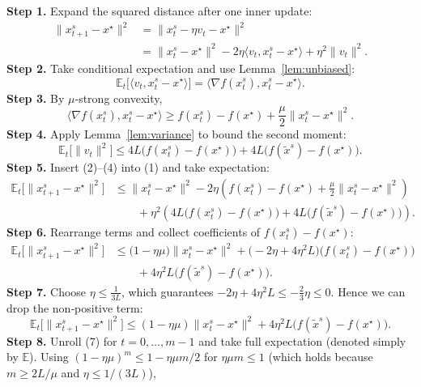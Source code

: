 \documentclass{article}
\begin{document}
\noindent\textbf{Step 1.} Expand the squared distance after one inner update:
\[
\begin{aligned}
\|x^{s}_{t+1}-x^{\star}\|^{2}
&=\|x^{s}_{t}-\eta v_t-x^{\star}\|^{2}\\
&=\|x^{s}_{t}-x^{\star}\|^{2}
   -2\eta\langle v_t,x^{s}_{t}-x^{\star}\rangle
   +\eta^{2}\|v_t\|^{2}.
\end{aligned}
\tag{1}
\]
\noindent\textbf{Step 2.} Take conditional expectation and use Lemma~\ref{lem:unbiased}:
\[
\mathbb{E}_t\!\bigl[\langle v_t,x^{s}_{t}-x^{\star}\rangle\bigr]
= \langle\nabla f(x^{s}_{t}),x^{s}_{t}-x^{\star}\rangle .
\tag{2}
\]
\noindent\textbf{Step 3.} By $\mu$‑strong convexity,
\[
\langle\nabla f(x^{s}_{t}),x^{s}_{t}-x^{\star}\rangle
\ge f(x^{s}_{t})-f(x^{\star})+\frac{\mu}{2}\|x^{s}_{t}-x^{\star}\|^{2}.
\tag{3}
\]
\noindent\textbf{Step 4.} Apply Lemma~\ref{lem:variance} to bound the second moment:
\[
\mathbb{E}_t\!\bigl[\|v_t\|^{2}\bigr]
\le 4L\bigl(f(x^{s}_{t})-f(x^{\star})\bigr)
   +4L\bigl(f(\tilde{x}^{s})-f(x^{\star})\bigr).
\tag{4}
\]
\noindent\textbf{Step 5.} Insert (2)–(4) into (1) and take expectation:
\[
\begin{aligned}
\mathbb{E}_t\!\bigl[\|x^{s}_{t+1}-x^{\star}\|^{2}\bigr]
&\le \|x^{s}_{t}-x^{\star}\|^{2}
   -2\eta\!\left(f(x^{s}_{t})-f(x^{\star})+\frac{\mu}{2}\|x^{s}_{t}-x^{\star}\|^{2}\right)\\
&\qquad +\eta^{2}\!\left(4L\bigl(f(x^{s}_{t})-f(x^{\star})\bigr)
   +4L\bigl(f(\tilde{x}^{s})-f(x^{\star})\bigr)\right).
\end{aligned}
\tag{5}
\]
\noindent\textbf{Step 6.} Rearrange terms and collect coefficients of $f(x^{s}_{t})-f(x^{\star})$:
\[
\begin{aligned}
\mathbb{E}_t\!\bigl[\|x^{s}_{t+1}-x^{\star}\|^{2}\bigr]
&\le \bigl(1-\eta\mu\bigr)\|x^{s}_{t}-x^{\star}\|^{2}
   +\bigl(-2\eta+4\eta^{2}L\bigr)\bigl(f(x^{s}_{t})-f(x^{\star})\bigr)\\
&\qquad +4\eta^{2}L\bigl(f(\tilde{x}^{s})-f(x^{\star})\bigr).
\end{aligned}
\tag{6}
\]
\noindent\textbf{Step 7.} Choose $\eta\le\frac{1}{3L}$, which guarantees $-2\eta+4\eta^{2}L\le -\frac{2}{3}\eta\le0$. Hence we can drop the non‑positive term:
\[
\mathbb{E}_t\!\bigl[\|x^{s}_{t+1}-x^{\star}\|^{2}\bigr]
\le (1-\eta\mu)\|x^{s}_{t}-x^{\star}\|^{2}
   +4\eta^{2}L\bigl(f(\tilde{x}^{s})-f(x^{\star})\bigr).
\tag{7}
\]
\noindent\textbf{Step 8.} Unroll (7) for $t=0,\dots,m-1$ and take full expectation (denoted simply by $\mathbb{E}$). Using $(1-\eta\mu)^{m}\le 1-\eta\mu m/2$ for $\eta\mu m\le1$ (which holds because $m\ge 2L/\mu$ and $\eta\le 1/(3L)$),
\end{document}
